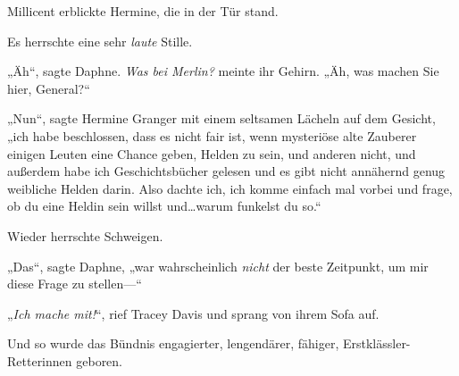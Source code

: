 Millicent erblickte Hermine, die in der Tür stand.

Es herrschte eine sehr \emph{laute} Stille.

„Äh“, sagte Daphne. \emph{Was bei Merlin?} meinte ihr Gehirn. „Äh, was machen Sie hier, General?“

„Nun“, sagte Hermine Granger mit einem seltsamen Lächeln auf dem Gesicht, „ich habe beschlossen, dass es nicht fair ist, wenn mysteriöse alte Zauberer einigen Leuten eine Chance geben, Helden zu sein, und anderen nicht, und außerdem habe ich Geschichtsbücher gelesen und es gibt nicht annähernd genug weibliche Helden darin. Also dachte ich, ich komme einfach mal vorbei und frage, ob du eine Heldin sein willst und…warum funkelst du so.“

Wieder herrschte Schweigen.

„Das“, sagte Daphne, „war wahrscheinlich \emph{nicht} der beste Zeitpunkt, um mir diese Frage zu stellen—“

„\emph{Ich mache mit!}“, rief Tracey Davis und sprang von ihrem Sofa auf.

\later

Und so wurde das Bündnis engagierter, lengendärer, fähiger, Erstklässler-Retterinnen geboren.%

